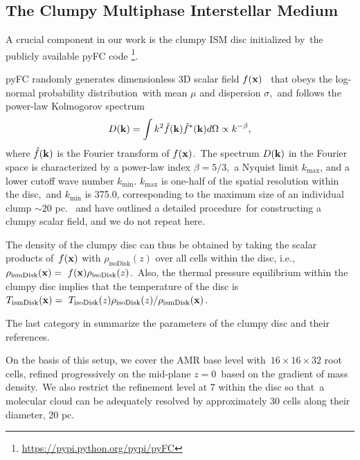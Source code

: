 \documentclass[fleqn,usenatbib,useAMS]{mnras}
\begin{document}


  \subsection{The Clumpy Multiphase Interstellar Medium}

  A crucial component in our work is the clumpy ISM disc initialized by\
  the publicly available pyFC code
  \footnote{\url{https://pypi.python.org/pypi/pyFC}}.\

  pyFC randomly generates dimensionless 3D scalar field $f(\bold{x})$\ %
  that obeys the log-normal probability distribution\
  with mean $\mu$ and dispersion $\sigma$,\
  and follows the power-law Kolmogorov spectrum
  \begin{equation}
    D(\bold{k})=\int k^{2} \hat{f}(\bold{k})\hat{f}^{*}(\bold{k})d\Omega \propto k^{-\beta},
    \label{Kolmogorov-spectrum}
  \end{equation}
  where $\hat{f}(\bold{k})$ is the Fourier transform of $f(\bold{x})$.\
  The spectrum $D(\bold{k})$ in the Fourier space is characterized by a power-law index $\beta=5/3$,\
  a Nyquist limit $k_{\text{max}}$, and a lower cutoff wave number $k_{\text{min}}$.
  $k_{\text{max}}$ is one-half of the spatial resolution within the disc,\
  and $k_{\text{min}}$ is 375.0, corresponding to the maximum size of an individual clump $\sim 20$ pc.\
  \citet{LA2002} and \citet{Wagner2012} have outlined a detailed procedure\
  for constructing a clumpy scalar field, and we do not repeat here.

  The density of the clumpy disc can thus be obtained by taking the scalar products of\
  $f(\bold{x})$ with $\rho_{\text{isoDisk}}(z)$ over all cells within the disc, i.e.,\
  $\displaystyle\rho_{\text{ismDisk}}(\bold{x}) =\
  f(\bold{x}) \rho_{\text{isoDisk}}(z)$.\
  Also, the thermal pressure equilibrium within the clumpy disc implies that the temperature of the disc is
  $\displaystyle T_{\text{ismDisk}}(\bold{x}) =\
  T_{\text{isoDisk}}(z)\rho_{\text{isoDisk}}(z)/\rho_{\text{ismDisk}}(\bold{x})$.


  The last category in \Cref{table-parameters} summarize the parameters of the clumpy disc and their references.

  On the basis of this setup, we cover the AMR base level with\
  $16\times16\times32$ root cells, refined progressively on the mid-plane $z=0$\
  based on the gradient of mass density.\
  We also restrict the refinement level at 7 within the disc so that\
  a molecular cloud can be adequately resolved by approximately 30 cells along their diameter, 20 pc.
\end{document}
